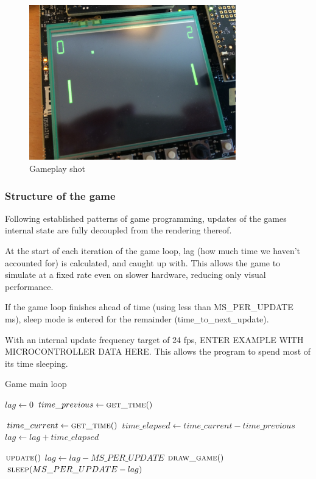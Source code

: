 \begin{figure}[H]
\centering
\includegraphics[width=0.8\textwidth]{figures/gameplay.jpg}
\caption{Gameplay shot}

\end{figure}

\subsubsection{Structure of the game}

Following established patterns of game programming, updates of the games
internal state are fully decoupled from the rendering thereof.

At the start of each iteration of the game loop, lag (how much time we haven't
accounted for) is calculated, and caught up with.  This allows the game to
simulate at a fixed rate even on slower hardware, reducing only visual
performance.

If the game loop finishes ahead of time (using less than MS\_PER\_UPDATE ms),
sleep mode is entered for the remainder (time\_to\_next\_update).

With an internal update frequency target of 24 fps, ENTER EXAMPLE WITH
MICROCONTROLLER DATA HERE.  This allows the program to spend most of its time
sleeping.

\begin{algorithm}
  \caption{Game main loop}
  \begin{algorithmic}
    \State $lag \gets 0$
    \State $time\_previous \gets \Call{get\_time}{\null}$

    \Loop
      \State $time\_current \gets \Call{get\_time}{\null}$
      \State $time\_elapsed \gets time\_current - time\_previous$
      \State $lag \gets lag + time\_elapsed$

        \State $\Call{update}{\null}$
        \State $lag \gets lag - MS\_PER\_UPDATE$
      \EndWhile
      \State $\Call{draw\_game}{\null}$
      \State $\Call{sleep}{MS\_PER\_UPDATE - lag}$
    \EndLoop
  \end{algorithmic}
\end{algorithm}

